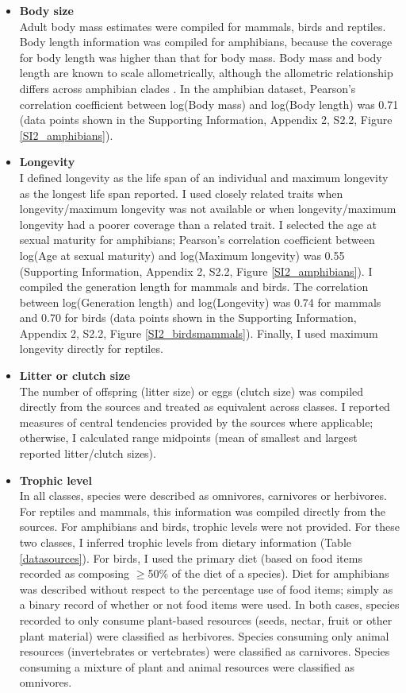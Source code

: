 \begin{itemize}
\item \textbf{Body size}\\
Adult body mass estimates were compiled for mammals, birds and reptiles. Body length information was compiled for amphibians, because the coverage for body length was higher than that for body mass. Body mass and body length are known to scale allometrically, although the allometric relationship differs across amphibian clades \citep{Santini2018}. In the amphibian dataset, Pearson’s correlation coefficient between log(Body mass) and log(Body length) was 0.71 (data points shown in the Supporting Information, Appendix 2, S2.2, Figure \ref{SI2_amphibians}).
 
\item \textbf{Longevity}\\
I defined longevity as the life span of an individual and maximum longevity as the longest life span reported. I used closely related traits when longevity/maximum longevity was not available or when longevity/maximum longevity had a poorer coverage than a related trait. I selected the age at sexual maturity for amphibians; Pearson’s correlation coefficient between log(Age at sexual maturity) and log(Maximum longevity) was 0.55 (Supporting Information, Appendix 2, S2.2, Figure \ref{SI2_amphibians}). I compiled the generation length for mammals and birds. The correlation between log(Generation length) and log(Longevity) was 0.74 for mammals and 0.70 for birds (data points shown in the Supporting Information, Appendix 2, S2.2, Figure \ref{SI2_birdsmammals}). Finally, I used maximum longevity directly for reptiles.

\item \textbf{Litter or clutch size}\\
The number of offspring (litter size) or eggs (clutch size) was compiled directly from the sources and treated as equivalent across classes. I reported measures of central tendencies provided by the sources where applicable; otherwise, I calculated range midpoints (mean of smallest and largest reported litter/clutch sizes).

\item \textbf{Trophic level}\\
In all classes, species were described as omnivores, carnivores or herbivores. For reptiles and mammals, this information was compiled directly from the sources. For amphibians and birds, trophic levels were not provided. For these two classes, I inferred trophic levels from dietary information (Table \ref{datasources}). For birds, I used the primary diet (based on food items recorded as composing $\geq$50\% of the diet of a species). Diet for amphibians was described without respect to the percentage use of food items; simply as a binary record of whether or not food items were used. In both cases, species recorded to only consume plant-based resources (seeds, nectar, fruit or other plant material) were classified as herbivores. Species consuming only animal resources (invertebrates or vertebrates) were classified as carnivores. Species consuming a mixture of plant and animal resources were classified as omnivores.


\end{itemize}
